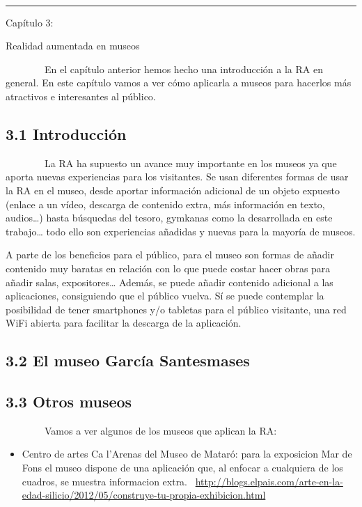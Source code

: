 ~~~~~~~~

\begin{center}\rule{3in}{0.4pt}\end{center}

Capítulo 3:

Realidad aumentada en museos

~~~~~~~~En el capítulo anterior hemos hecho una introducción a la RA en
general. En este capítulo vamos a ver cómo aplicarla a museos para
hacerlos más atractivos e interesantes al público.

\subsection{3.1 Introducción}\label{h.c7u31zer9vix}

~~~~~~~~La RA ha supuesto un avance muy importante en los museos ya que
aporta nuevas experiencias para los visitantes. Se usan diferentes
formas de usar la RA en el museo, desde aportar información adicional de
un objeto expuesto (enlace a un vídeo, descarga de contenido extra, más
información en texto, audios\ldots{}) hasta búsquedas del tesoro,
gymkanas como la desarrollada en este trabajo\ldots{} todo ello son
experiencias añadidas y nuevas para la mayoría de museos.

A parte de los beneficios para el público, para el museo son formas de
añadir contenido muy baratas en relación con lo que puede costar hacer
obras para añadir salas, expositores\ldots{} Además, se puede añadir
contenido adicional a las aplicaciones, consiguiendo que el público
vuelva. Sí se puede contemplar la posibilidad de tener smartphones y/o
tabletas para el público visitante, una red WiFi abierta para facilitar
la descarga de la aplicación.

\subsection{3.2 El museo García Santesmases}\label{h.w6fqwheeko74}

\subsection{3.3 Otros museos}\label{h.alfq827rfehx}

~~~~~~~~Vamos a ver algunos de los museos que aplican la RA:

\begin{itemize}
\itemsep1pt\parskip0pt
\item
  Centro de artes Ca l'Arenas del Museo de Mataró: para la exposicion
  Mar de Fons el museo dispone de una aplicación que, al enfocar a
  cualquiera de los cuadros, se muestra informacion extra.
  ~\href{https://www.google.com/url?q=http://blogs.elpais.com/arte-en-la-edad-silicio/2012/05/construye-tu-propia-exhibicion.html\&sa=D\&ust=1464634042346000\&usg=AFQjCNHvgsQY0u1IlFpSEFDb2hRFwhUq7A}{http://blogs.elpais.com/arte-en-la-edad-silicio/2012/05/construye-tu-propia-exhibicion.html}
\end{itemize}

